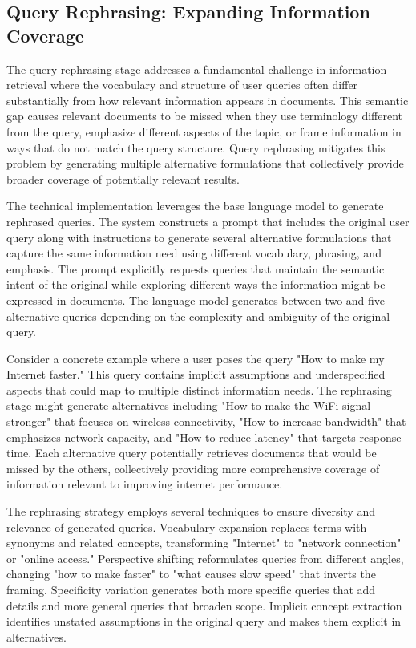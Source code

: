 \subsection{Query Rephrasing: Expanding Information Coverage}

The query rephrasing stage addresses a fundamental challenge in information retrieval where the vocabulary and structure of user queries often differ substantially from how relevant information appears in documents. This semantic gap causes relevant documents to be missed when they use terminology different from the query, emphasize different aspects of the topic, or frame information in ways that do not match the query structure. Query rephrasing mitigates this problem by generating multiple alternative formulations that collectively provide broader coverage of potentially relevant results.

The technical implementation leverages the base language model to generate rephrased queries. The system constructs a prompt that includes the original user query along with instructions to generate several alternative formulations that capture the same information need using different vocabulary, phrasing, and emphasis. The prompt explicitly requests queries that maintain the semantic intent of the original while exploring different ways the information might be expressed in documents. The language model generates between two and five alternative queries depending on the complexity and ambiguity of the original query.

Consider a concrete example where a user poses the query "How to make my Internet faster." This query contains implicit assumptions and underspecified aspects that could map to multiple distinct information needs. The rephrasing stage might generate alternatives including "How to make the WiFi signal stronger" that focuses on wireless connectivity, "How to increase bandwidth" that emphasizes network capacity, and "How to reduce latency" that targets response time. Each alternative query potentially retrieves documents that would be missed by the others, collectively providing more comprehensive coverage of information relevant to improving internet performance.

The rephrasing strategy employs several techniques to ensure diversity and relevance of generated queries. Vocabulary expansion replaces terms with synonyms and related concepts, transforming "Internet" to "network connection" or "online access." Perspective shifting reformulates queries from different angles, changing "how to make faster" to "what causes slow speed" that inverts the framing. Specificity variation generates both more specific queries that add details and more general queries that broaden scope. Implicit concept extraction identifies unstated assumptions in the original query and makes them explicit in alternatives.

